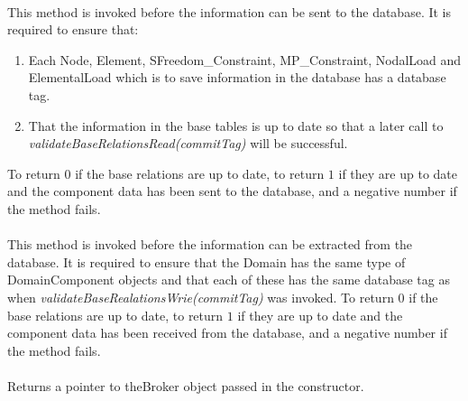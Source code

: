 \\
This method is invoked before the information can be sent to the
database. It is required to ensure that: \begin{enumerate} 
\item Each Node, Element, SFreedom\_Constraint, MP\_Constraint, NodalLoad and
ElementalLoad which is to save information in the database has a
database tag.
\item That the information in the base tables is up to date so that a
later call to {\em validateBaseRelationsRead(commitTag)} will be successful.
\end{enumerate}
\noindent To return $0$ if the base relations are up to date, to return
$1$ if they are up to date and the component data has been sent to the
database, and a negative number if the method fails. \\

\\
This method is invoked before the information can be extracted from the
database. It is required to ensure that the Domain has the same
type of DomainComponent objects and that each of these has the same
database tag as when {\em validateBaseRealationsWrie(commitTag)} was
invoked.  To return $0$ if the base relations are up to date, to return
$1$ if they are up to date and the component data has been received from the
database, and a negative number if the method fails. \\

\\
Returns a pointer to \p theBroker object passed in the constructor. 

